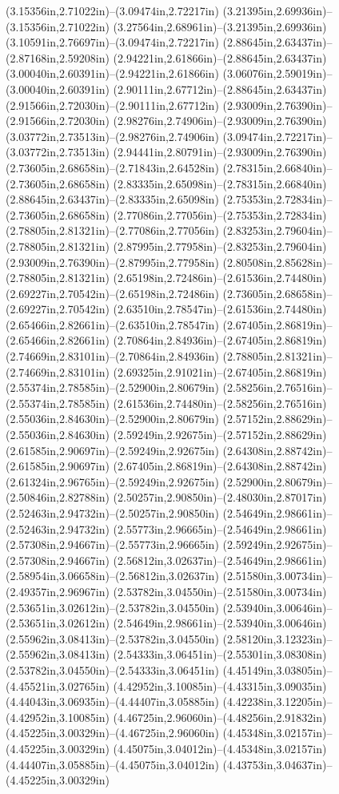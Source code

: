 (3.15356in,2.71022in)--(3.09474in,2.72217in) (3.21395in,2.69936in)--(3.15356in,2.71022in) (3.27564in,2.68961in)--(3.21395in,2.69936in) (3.10591in,2.76697in)--(3.09474in,2.72217in) (2.88645in,2.63437in)--(2.87168in,2.59208in) (2.94221in,2.61866in)--(2.88645in,2.63437in) (3.00040in,2.60391in)--(2.94221in,2.61866in) (3.06076in,2.59019in)--(3.00040in,2.60391in) (2.90111in,2.67712in)--(2.88645in,2.63437in) (2.91566in,2.72030in)--(2.90111in,2.67712in) (2.93009in,2.76390in)--(2.91566in,2.72030in) (2.98276in,2.74906in)--(2.93009in,2.76390in) (3.03772in,2.73513in)--(2.98276in,2.74906in) (3.09474in,2.72217in)--(3.03772in,2.73513in) (2.94441in,2.80791in)--(2.93009in,2.76390in) (2.73605in,2.68658in)--(2.71843in,2.64528in) (2.78315in,2.66840in)--(2.73605in,2.68658in) (2.83335in,2.65098in)--(2.78315in,2.66840in) (2.88645in,2.63437in)--(2.83335in,2.65098in) (2.75353in,2.72834in)--(2.73605in,2.68658in) (2.77086in,2.77056in)--(2.75353in,2.72834in) (2.78805in,2.81321in)--(2.77086in,2.77056in) (2.83253in,2.79604in)--(2.78805in,2.81321in) (2.87995in,2.77958in)--(2.83253in,2.79604in) (2.93009in,2.76390in)--(2.87995in,2.77958in) (2.80508in,2.85628in)--(2.78805in,2.81321in) (2.65198in,2.72486in)--(2.61536in,2.74480in) (2.69227in,2.70542in)--(2.65198in,2.72486in) (2.73605in,2.68658in)--(2.69227in,2.70542in) (2.63510in,2.78547in)--(2.61536in,2.74480in) (2.65466in,2.82661in)--(2.63510in,2.78547in) (2.67405in,2.86819in)--(2.65466in,2.82661in) (2.70864in,2.84936in)--(2.67405in,2.86819in) (2.74669in,2.83101in)--(2.70864in,2.84936in) (2.78805in,2.81321in)--(2.74669in,2.83101in) (2.69325in,2.91021in)--(2.67405in,2.86819in) (2.55374in,2.78585in)--(2.52900in,2.80679in) (2.58256in,2.76516in)--(2.55374in,2.78585in) (2.61536in,2.74480in)--(2.58256in,2.76516in) (2.55036in,2.84630in)--(2.52900in,2.80679in) (2.57152in,2.88629in)--(2.55036in,2.84630in) (2.59249in,2.92675in)--(2.57152in,2.88629in) (2.61585in,2.90697in)--(2.59249in,2.92675in) (2.64308in,2.88742in)--(2.61585in,2.90697in) (2.67405in,2.86819in)--(2.64308in,2.88742in) (2.61324in,2.96765in)--(2.59249in,2.92675in) (2.52900in,2.80679in)--(2.50846in,2.82788in) (2.50257in,2.90850in)--(2.48030in,2.87017in) (2.52463in,2.94732in)--(2.50257in,2.90850in) (2.54649in,2.98661in)--(2.52463in,2.94732in) (2.55773in,2.96665in)--(2.54649in,2.98661in) (2.57308in,2.94667in)--(2.55773in,2.96665in) (2.59249in,2.92675in)--(2.57308in,2.94667in) (2.56812in,3.02637in)--(2.54649in,2.98661in) (2.58954in,3.06658in)--(2.56812in,3.02637in) (2.51580in,3.00734in)--(2.49357in,2.96967in) (2.53782in,3.04550in)--(2.51580in,3.00734in) (2.53651in,3.02612in)--(2.53782in,3.04550in) (2.53940in,3.00646in)--(2.53651in,3.02612in) (2.54649in,2.98661in)--(2.53940in,3.00646in) (2.55962in,3.08413in)--(2.53782in,3.04550in) (2.58120in,3.12323in)--(2.55962in,3.08413in) (2.54333in,3.06451in)--(2.55301in,3.08308in) (2.53782in,3.04550in)--(2.54333in,3.06451in) (4.45149in,3.03805in)--(4.45521in,3.02765in) (4.42952in,3.10085in)--(4.43315in,3.09035in) (4.44043in,3.06935in)--(4.44407in,3.05885in) (4.42238in,3.12205in)--(4.42952in,3.10085in) (4.46725in,2.96060in)--(4.48256in,2.91832in) (4.45225in,3.00329in)--(4.46725in,2.96060in) (4.45348in,3.02157in)--(4.45225in,3.00329in) (4.45075in,3.04012in)--(4.45348in,3.02157in) (4.44407in,3.05885in)--(4.45075in,3.04012in) (4.43753in,3.04637in)--(4.45225in,3.00329in) 